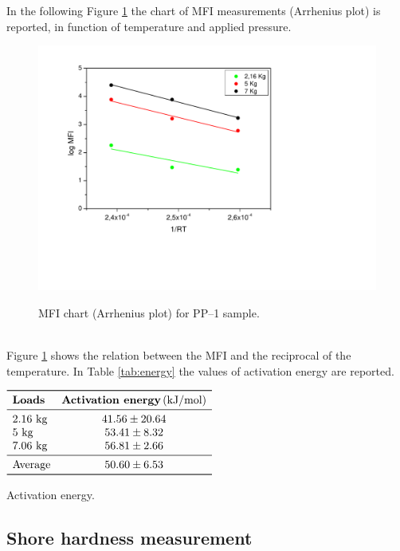 \documentclass[a4paper, 11pt]{article}
\begin{document}
In the following Figure \ref{fig:arrhenius} the chart of MFI measurements (Arrhenius plot) is reported, in function of temperature and applied pressure. 
\begin{figure}[h!]
	\centering
	{\includegraphics[scale=0.4]{arrhenius}}
	\captionsetup{justification=centering}
	\caption{MFI chart (Arrhenius plot) for PP–1 sample.}
	\label{fig:arrhenius}
\end{figure}\\
Figure \ref{fig:arrhenius} shows the relation between the MFI and the reciprocal of the temperature. In Table \ref{tab:energy} the values of activation energy are reported.
\begin{table}[htp]
\centering
$
\begin{array}{lc}
\toprule
\textbf{Loads} & \textbf{Activation energy} \, \text{(kJ/mol)}  \\
\midrule
\text{2.16 kg} & 41.56 \pm 20.64  \\
\text{5 kg} & 53.41 \pm 8.32 \\
\text{7.06 kg} & 56.81 \pm 2.66  \\
\midrule
\text{Average} & 50.60 \pm 6.53 \\
\bottomrule
\end{array}
$
\caption{Activation energy.}
\label{tab:energy}
\end{table}

\newpage

\subsection{Shore hardness measurement}
\end{document}
